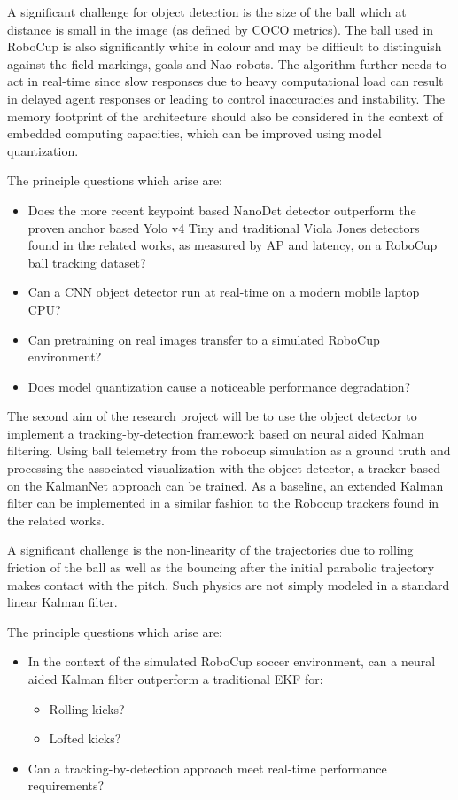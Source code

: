 \documentclass[a4paper,twoside,12pt]{report}
\begin{document}
A significant challenge for object detection is the size of the ball which at distance is small in the image (as defined by COCO metrics). The ball used in RoboCup is also significantly white in colour and may be difficult to distinguish against the field markings, goals and Nao robots. The algorithm further needs to act in real-time since slow responses due to heavy computational load can result in delayed agent responses or leading to control inaccuracies and instability. The memory footprint of the architecture should also be considered in the context of embedded computing capacities, which can be improved using model quantization.

The principle questions which arise are:
\begin{itemize}
    \item Does the more recent keypoint based NanoDet detector outperform the proven anchor based Yolo v4 Tiny and traditional Viola Jones detectors found in the related works, as measured by AP and latency, on a RoboCup ball tracking dataset? 
    \item Can a CNN object detector run at real-time on a modern mobile laptop CPU?
    \item Can pretraining on real images transfer to a simulated RoboCup environment?
    \item Does model quantization cause a noticeable performance degradation? 
\end{itemize}

The second aim of the research project will be to use the object detector to implement a tracking-by-detection framework based on neural aided Kalman filtering. Using ball telemetry from the robocup simulation as a ground truth and processing the associated visualization with the object detector, a tracker based on the KalmanNet approach can be trained. As a baseline, an extended Kalman filter can be implemented in a similar fashion to the Robocup trackers found in the related works. 

A significant challenge is the non-linearity of the trajectories due to rolling friction of the ball as well as the bouncing after the initial parabolic trajectory makes contact with the pitch. Such physics are not simply modeled in a standard linear Kalman filter. 

The principle questions which arise are:
\begin{itemize}
    \item In the context of the simulated RoboCup soccer environment, can a neural aided Kalman filter outperform a traditional EKF for:
    \begin{itemize}
    	\item Rolling kicks?
    	\item Lofted kicks?
	\end{itemize}
	\item Can a tracking-by-detection approach meet real-time performance requirements?
\end{itemize}
\end{document}
